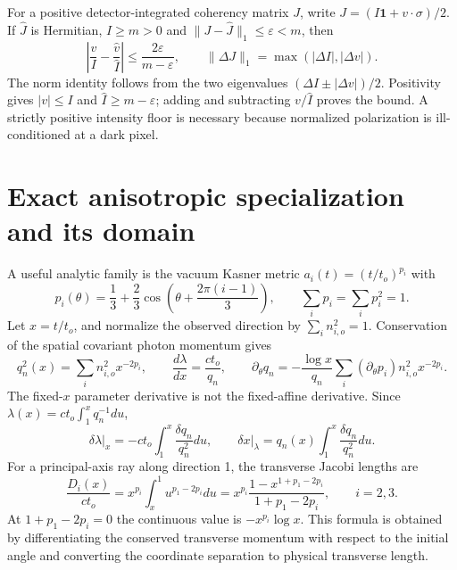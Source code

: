 For a positive detector-integrated coherency matrix $J$, write $J=(I\mathbf1+v\cdot\sigma)/2$. If $\widehat J$ is Hermitian, $I\ge m>0$ and $\|J-\widehat J\|_1\le\varepsilon<m$, then
\begin{equation}\label{vii:stokes_error}
\left|\frac{v}{I}-\frac{\widehat v}{\widehat I}\right|
\le\frac{2\varepsilon}{m-\varepsilon},\qquad
\|\Delta J\|_1=\max(|\Delta I|,|\Delta v|).
\end{equation}
The norm identity follows from the two eigenvalues $(\Delta I\pm|\Delta v|)/2$. Positivity gives $|v|\le I$ and $\widehat I\ge m-\varepsilon$; adding and subtracting $v/\widehat I$ proves the bound. A strictly positive intensity floor is necessary because normalized polarization is ill-conditioned at a dark pixel.

\section{Exact anisotropic specialization and its domain}
A useful analytic family is the vacuum Kasner metric $a_i(t)=(t/t_o)^{p_i}$ with
\begin{equation}\label{vii:kasner_family}
p_i(\theta)=\frac13+\frac23\cos\!\left(\theta+\frac{2\pi(i-1)}3\right),\qquad
\sum_ip_i=\sum_ip_i^2=1.
\end{equation}
Let $x=t/t_o$, and normalize the observed direction by $\sum_i n_{i,o}^2=1$. Conservation of the spatial covariant photon momentum gives
\begin{equation}\label{vii:kasner_redshift}
q_n^2(x)=\sum_i n_{i,o}^2x^{-2p_i},\qquad
\frac{d\lambda}{dx}=\frac{ct_o}{q_n},\qquad
\partial_\theta q_n=-\frac{\log x}{q_n}\sum_i(\partial_\theta p_i)n_{i,o}^2x^{-2p_i}.
\end{equation}
The fixed-$x$ parameter derivative is not the fixed-affine derivative. Since $\lambda(x)=ct_o\int_1^xq_n^{-1}du$,
\begin{equation}\label{vii:kasner_affine_tangent}
\left.\delta\lambda\right|_x=-ct_o\int_1^x\frac{\delta q_n}{q_n^2}du,
\qquad
\left.\delta x\right|_\lambda=q_n(x)\int_1^x\frac{\delta q_n}{q_n^2}du.
\end{equation}
For a principal-axis ray along direction 1, the transverse Jacobi lengths are
\begin{equation}\label{vii:kasner_axis_jacobi}
\frac{D_i(x)}{ct_o}=x^{p_i}\int_x^1u^{p_1-2p_i}du
=x^{p_i}\frac{1-x^{1+p_1-2p_i}}{1+p_1-2p_i},\qquad i=2,3.
\end{equation}
At $1+p_1-2p_i=0$ the continuous value is $-x^{p_i}\log x$. This formula is obtained by differentiating the conserved transverse momentum with respect to the initial angle and converting the coordinate separation to physical transverse length.


